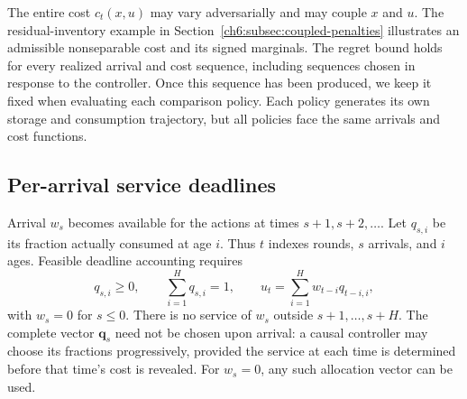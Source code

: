 \documentclass[11pt]{article}
\theoremstyle{plain}
\theoremstyle{remark}
\numberwithin{equation}{section}
\begin{document}
The entire cost $c_t(x,u)$ may vary adversarially and may couple $x$ and $u$.
The residual-inventory example in
Section~\ref{ch6:subsec:coupled-penalties} illustrates an admissible
nonseparable cost and its signed marginals.
The regret bound holds for every realized arrival and cost sequence,
including sequences chosen in response to the controller. Once this
sequence has been produced, we keep it fixed when evaluating each
comparison policy. Each policy generates its own storage and consumption
trajectory, but all policies face the same arrivals and cost functions.

\subsection{Per-arrival service deadlines}
Arrival $w_s$ becomes available for the actions at times $s+1,s+2,\ldots$.
Let $q_{s,i}$ be its fraction actually consumed at age $i$. Thus $t$ indexes
rounds, $s$ arrivals, and $i$ ages. Feasible deadline accounting requires
\begin{equation}\label{ch6:eq:deadline}
 q_{s,i}\ge0,\qquad \sum_{i=1}^Hq_{s,i}=1,\qquad
 u_t=\sum_{i=1}^H w_{t-i}q_{t-i,i},
\end{equation}
with $w_s=0$ for $s\le0$. There is no service of $w_s$ outside
$s+1,\ldots,s+H$. The complete vector $\mathbf q_s$ need not be chosen upon arrival:
a causal controller may choose its fractions progressively, provided the
service at each time is determined before that time's cost is revealed.
For $w_s=0$, any such allocation vector can be used.
\end{document}
